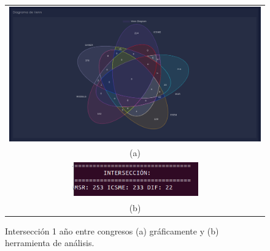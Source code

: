 \documentclass[a4paper, 12pt]{book}
\begin{document}
\begin{figure}[!h]
    \centering
    \begin{tabular}{c}
    \includegraphics[width=1\textwidth]{img/inter_1_year_graph.png} \\
    (a) \\
    \includegraphics[width=0.5\textwidth]{img/inter_1_year.png} \\
    (b)
    \end{tabular}
    \caption{Intersección 1 año entre congresos (a) gráficamente y (b) herramienta de análisis.}
    \label{fig:comp_inter_1_year}
\end{figure}
\end{document}
